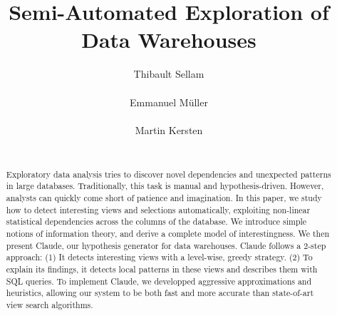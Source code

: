 \documentclass{sig-alternate}
\begin{document}
\title{Semi-Automated Exploration of Data Warehouses}


\author{
\alignauthor
Thibault Sellam\\
       \\
\alignauthor
Emmanuel M\"uller\\
       \\
\alignauthor
Martin Kersten\\
       \\
}

\maketitle

\begin{abstract}
Exploratory data analysis tries to discover novel dependencies and unexpected
patterns in large databases. Traditionally, this task is manual and
hypothesis-driven. However, analysts can quickly come short of patience and
imagination. In this paper, we study how to detect interesting views and
selections automatically, exploiting non-linear statistical dependencies across
the columns of the database. We introduce simple notions of information theory,
and derive a complete model of interestingness. We then present Claude, our
hypothesis generator for data warehouses. Claude follows a 2-step approach: (1)
It detects interesting views with a level-wise, greedy strategy.  (2) To
explain its findings, it detects local patterns in these views and describes
them with SQL queries.  To implement Claude, we developped aggressive
approximations and heuristics, allowing our system to be both fast and more
accurate than state-of-art view search algorithms. 
\end{abstract}




\balancecolumns
\end{document}
